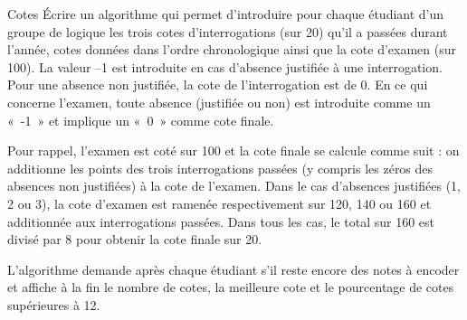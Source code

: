 \begin{Exercice}{Cotes}
	Écrire un algorithme qui permet d’introduire
	pour chaque étudiant d’un groupe de logique les trois cotes
	d’interrogations (sur 20) qu’il a passées durant l’année, cotes données
	dans l’ordre chronologique ainsi que la cote d'examen
	(sur 100). La valeur –1 est introduite en cas d’absence justifiée à une
	interrogation. Pour une absence non justifiée, la cote de
	l’interrogation est de 0. En ce qui concerne l'examen,
	toute absence (justifiée ou non) est introduite comme un «~-1~» et
	implique un «~0~» comme cote finale.
	
	Pour rappel, l’examen est coté sur 100 et la cote finale se calcule
	comme suit : on additionne les points des trois interrogations passées
	(y compris les zéros des absences non justifiées) à la cote de
	l’examen. Dans le cas d’absences justifiées (1, 2 ou 3), la cote
	d’examen est ramenée respectivement sur 120, 140 ou 160 et additionnée
	aux interrogations passées. Dans tous les cas, le total sur 160 est
	divisé par 8 pour obtenir la cote finale sur 20.
	
	L'algorithme demande après chaque étudiant
	s'il reste encore des notes à encoder et affiche à la
	fin le nombre de cotes, la meilleure cote et le pourcentage de cotes
	supérieures à 12.
\end{Exercice}

